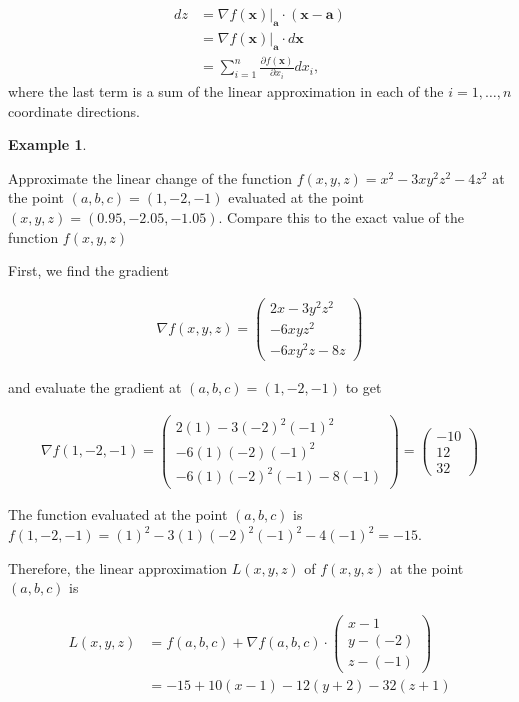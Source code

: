 \documentclass[
]{book}
\theoremstyle{definition}
\theoremstyle{definition}
\newtheorem{example}{Example}[chapter]
\theoremstyle{definition}
\theoremstyle{remark}
\begin{document}
\[
\begin{aligned}
d z & =  \nabla f(\mathbf{x}) |_{\mathbf{a}} \cdot (\mathbf{x} - \mathbf{a}) \\
& = \nabla f(\mathbf{x}) |_{\mathbf{a}} \cdot d \mathbf{x} \\
& = \sum_{i=1}^n \frac{\partial f(\mathbf{x})}{\partial x_i} d x_i,
\end{aligned}
\]
where the last term is a sum of the linear approximation in each of the \(i = 1, \ldots, n\) coordinate directions.

\begin{example}
\protect\hypertarget{exm:unlabeled-div-222}{}\label{exm:unlabeled-div-222}

Approximate the linear change of the function \(f(x, y, z) = x^2 - 3xy^2z^2 - 4z^2\) at the point \((a, b, c) = (1, -2, -1)\) evaluated at the point \((x, y, z) = (0.95, -2.05, -1.05)\). Compare this to the exact value of the function \(f(x, y, z)\)

First, we find the gradient

\[
\begin{aligned}
\nabla f(x, y, z) = \begin{pmatrix} 2x - 3y^2z^2 \\ -6xyz^2 \\ -6xy^2z - 8z \end{pmatrix}
\end{aligned}
\]

and evaluate the gradient at \((a, b, c) = (1, -2, -1)\) to get

\[
\begin{aligned}
\nabla f(1, -2, -1) = \begin{pmatrix} 2(1) - 3(-2)^2(-1)^2 \\ -6(1)(-2)(-1)^2 \\ -6(1)(-2)^2(-1) - 8(-1) \end{pmatrix} = \begin{pmatrix} -10 \\ 12 \\ 32 \end{pmatrix} 
\end{aligned}
\]

The function evaluated at the point \((a, b, c)\) is \(f(1, -2, -1) = (1)^2 - 3(1)(-2)^2(-1)^2 - 4(-1)^2 = -15\).

Therefore, the linear approximation \(L(x, y, z)\) of \(f(x, y, z)\) at the point \((a, b, c)\) is

\[
\begin{aligned}
L(x, y, z) & = f(a, b, c) + \nabla f(a, b, c) \cdot \begin{pmatrix} x - 1 \\ y - (-2) \\ z - (-1) \end{pmatrix} \\
& = -15 + 10(x - 1) - 12 (y + 2) - 32 (z + 1)
\end{aligned}
\]


\end{example}
\end{document}
